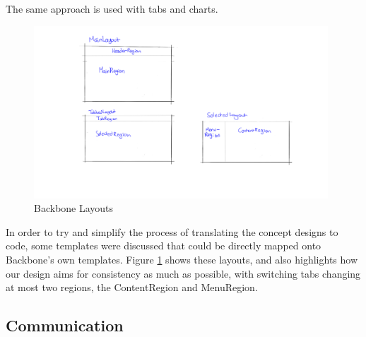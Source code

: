 \documentclass{l3proj}
\begin{document}
The same approach is used with tabs and charts.

\begin{figure}[H]
\centering
\includegraphics[width=110mm]{Concept_Designs/BackboneLayouts.png}
\caption{Backbone Layouts}
\label{fig:BackboneLayouts}
\end{figure}

In order to try and simplify the process of translating the concept designs to code, some templates were discussed that could be directly mapped onto Backbone's own templates. Figure \ref{fig:BackboneLayouts} shows these layouts, and also highlights how our design aims for consistency as much as possible, with switching tabs changing at most two regions, the ContentRegion and MenuRegion.

\subsection{Communication}
\end{document}
